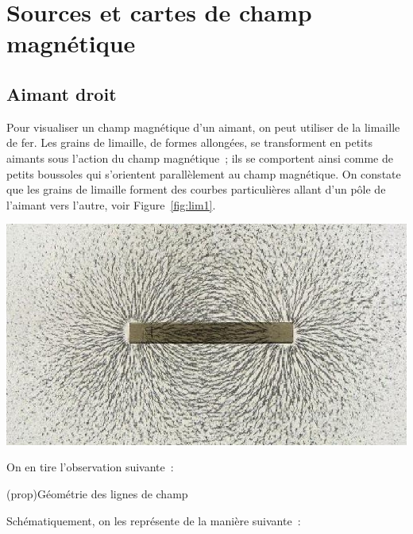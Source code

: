 \documentclass[../../main/main.tex]{subfiles}
\begin{document}
\section{Sources et cartes de champ magnétique}
\subsection{Aimant droit}
\label{ssec:aimdroit}
\noindent
\begin{minipage}[c]{.48\linewidth}
	Pour visualiser un champ magnétique d'un aimant, on peut utiliser de la limaille
	de fer. Les grains de limaille, de formes allongées, se transforment en petits
	aimants sous l'action du champ magnétique~; ils se comportent ainsi comme de
	petits boussoles qui s'orientent parallèlement au champ magnétique. On constate
	que les grains de limaille forment des courbes particulières allant d'un pôle de
	l'aimant vers l'autre, voir Figure~\ref{fig:lim1}.
\end{minipage}
\hfill
\begin{minipage}[c]{.48\linewidth}
	\begin{center}
		\includegraphics[scale=1]{aimdroit_lim.jpg}
		\label{fig:lim1}
	\end{center}
\end{minipage}

On en tire l'observation suivante~:
\begin{tcb*}(prop){Géométrie des lignes de champ}
\end{tcb*}
Schématiquement, on les représente de la manière suivante~:
\end{document}

